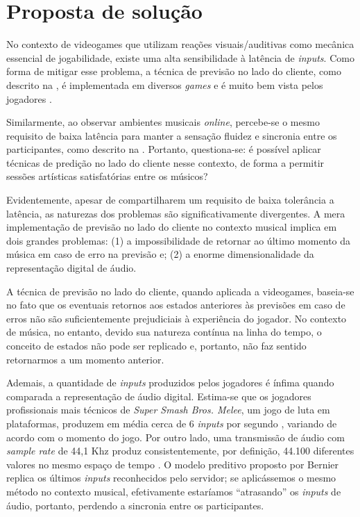 \chapter{Proposta de solução}
\label{chap:solution_propositon}

No contexto de videogames que utilizam reações visuais/auditivas como mecânica essencial de jogabilidade, existe uma alta sensibilidade à latência de \textit{inputs}. Como forma de mitigar esse problema, a técnica de previsão no lado do cliente, como descrito na , é implementada em diversos \textit{games} e é muito bem vista pelos jogadores \cite{rollback_success}.

Similarmente, ao observar ambientes musicais \textit{online}, percebe-se o mesmo requisito de baixa latência para manter a sensação fluidez e sincronia entre os participantes, como descrito na . Portanto, questiona-se: é possível aplicar técnicas de predição no lado do cliente nesse contexto, de forma a permitir sessões artísticas satisfatórias entre os músicos?

Evidentemente, apesar de compartilharem um requisito de baixa tolerância a latência, as naturezas dos problemas são significativamente divergentes. A mera implementação de previsão no lado do cliente no contexto musical implica em dois grandes problemas: (1) a impossibilidade de retornar ao último momento da música em caso de erro na previsão e; (2) a enorme dimensionalidade da representação digital de áudio.

A técnica de previsão no lado do cliente, quando aplicada a videogames, baseia-se no fato que os eventuais retornos aos estados anteriores às previsões em caso de erros não são suficientemente prejudiciais à experiência do jogador. No contexto de música, no entanto, devido sua natureza contínua na linha do tempo, o conceito de estados não pode ser replicado e, portanto, não faz sentido retornarmos a um momento anterior.
 
Ademais, a quantidade de \textit{inputs} produzidos pelos jogadores é ínfima quando comparada a representação de áudio digital. Estima-se que os jogadores profissionais mais técnicos de \textit{Super Smash Bros. Melee}, um jogo de luta em plataformas, produzem em média cerca de 6 \textit{inputs} por segundo \cite{melee_inputs_per_second}, variando de acordo com o momento do jogo. Por outro lado, uma transmissão de áudio com \textit{sample rate} de 44,1 Khz produz consistentemente, por definição, 44.100 diferentes valores no mesmo espaço de tempo \cite{jukebox_dimension}. O modelo preditivo proposto por Bernier \cite{client-side-prediction} replica os últimos \textit{inputs} reconhecidos pelo servidor; se aplicássemos o mesmo método no contexto musical, efetivamente estaríamos ``atrasando'' os \textit{inputs} de áudio, portanto, perdendo a sincronia entre os participantes.

